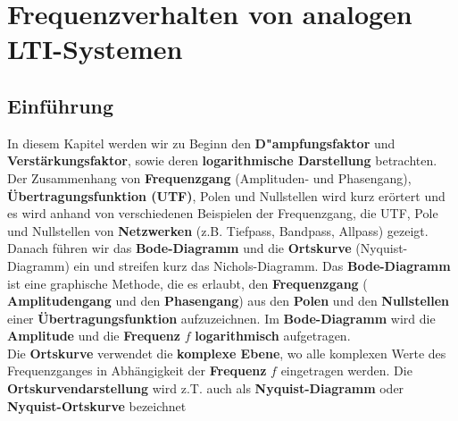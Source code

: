 \renewcommand{\thesection}{\thechapter.\arabic{section}}
\setcounter{Aufgabe}{0}\setcounter{Beispiel}{0}
\chapter{Frequenzverhalten von analogen LTI-Systemen}\label{kapitel_Frequenzverhalten} 

\section{Einf\"uhrung}
In diesem Kapitel werden wir zu Beginn den {\bf D"ampfungsfaktor} und
{\bf Verst\"arkungs\-faktor}, sowie deren {\bf logarithmische
  Darstellung} betrachten. \\
\nit Der Zusammenhang von {\bf Frequenzgang} (Amplituden- und Phasengang),\\ {\bf \"Uber\-tragungsfunktion (UTF)}, Polen und Nullstellen wird kurz er\"ortert und es wird  anhand von verschiedenen Beispielen der Frequenzgang, die UTF, Pole und Nullstellen von {\bf Netzwerken} (z.B. Tiefpass, Bandpass, Allpass) gezeigt.\\
\nit Danach f\"uhren wir das {\bf Bode-Diagramm} und die {\bf
  Ortskurve} (Nyquist-Diagramm) ein und streifen kurz das
Nichols-Diagramm. Das {\bf Bode-Diagramm} ist
eine graphische Methode, die es erlaubt, den {\bf
  Frequenzgang} ({\bf
  Amplitudengang} und den {\bf
  Phasengang}) aus den {\bf Polen} und
den {\bf Nullstellen} einer {\bf
  \"Uber\-tragungs\-funktion}
aufzuzeichnen. Im {\bf Bode-Diagramm} wird die {\bf
  Amplitude} und die {\bf Frequenz}
{\boldmath $f$} {\bf logarithmisch}
aufgetragen.\\ \nit Die {\bf Ortskurve} verwendet die
{\bf komplexe Ebene}, wo alle komplexen Werte
des Frequenzganges in Abh\"angigkeit der {\bf Frequenz} {\boldmath
  $f$} eingetragen werden. Die {\bf Ortskurvendarstellung} wird z.T.
auch als {\bf Nyquist-Diagramm} oder {\bf
  Nyquist-Ortskurve} bezeichnet
